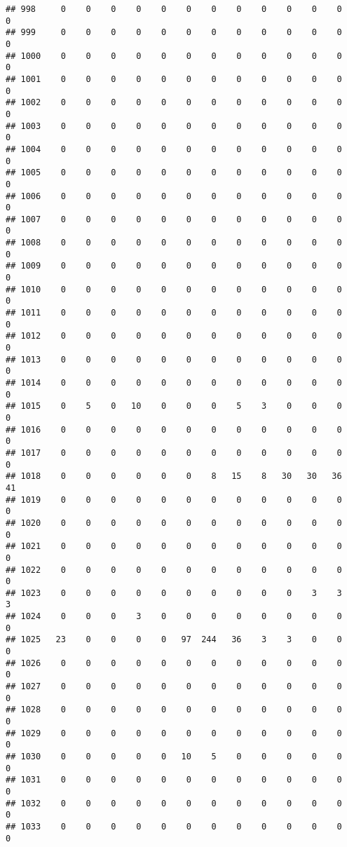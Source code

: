 \documentclass[]{article}
\begin{document}
\begin{verbatim}
## 998     0    0    0    0    0    0    0    0    0    0    0    0    0
## 999     0    0    0    0    0    0    0    0    0    0    0    0    0
## 1000    0    0    0    0    0    0    0    0    0    0    0    0    0
## 1001    0    0    0    0    0    0    0    0    0    0    0    0    0
## 1002    0    0    0    0    0    0    0    0    0    0    0    0    0
## 1003    0    0    0    0    0    0    0    0    0    0    0    0    0
## 1004    0    0    0    0    0    0    0    0    0    0    0    0    0
## 1005    0    0    0    0    0    0    0    0    0    0    0    0    0
## 1006    0    0    0    0    0    0    0    0    0    0    0    0    0
## 1007    0    0    0    0    0    0    0    0    0    0    0    0    0
## 1008    0    0    0    0    0    0    0    0    0    0    0    0    0
## 1009    0    0    0    0    0    0    0    0    0    0    0    0    0
## 1010    0    0    0    0    0    0    0    0    0    0    0    0    0
## 1011    0    0    0    0    0    0    0    0    0    0    0    0    0
## 1012    0    0    0    0    0    0    0    0    0    0    0    0    0
## 1013    0    0    0    0    0    0    0    0    0    0    0    0    0
## 1014    0    0    0    0    0    0    0    0    0    0    0    0    0
## 1015    0    5    0   10    0    0    0    5    3    0    0    0    0
## 1016    0    0    0    0    0    0    0    0    0    0    0    0    0
## 1017    0    0    0    0    0    0    0    0    0    0    0    0    0
## 1018    0    0    0    0    0    0    8   15    8   30   30   36   41
## 1019    0    0    0    0    0    0    0    0    0    0    0    0    0
## 1020    0    0    0    0    0    0    0    0    0    0    0    0    0
## 1021    0    0    0    0    0    0    0    0    0    0    0    0    0
## 1022    0    0    0    0    0    0    0    0    0    0    0    0    0
## 1023    0    0    0    0    0    0    0    0    0    0    3    3    3
## 1024    0    0    0    3    0    0    0    0    0    0    0    0    0
## 1025   23    0    0    0    0   97  244   36    3    3    0    0    0
## 1026    0    0    0    0    0    0    0    0    0    0    0    0    0
## 1027    0    0    0    0    0    0    0    0    0    0    0    0    0
## 1028    0    0    0    0    0    0    0    0    0    0    0    0    0
## 1029    0    0    0    0    0    0    0    0    0    0    0    0    0
## 1030    0    0    0    0    0   10    5    0    0    0    0    0    0
## 1031    0    0    0    0    0    0    0    0    0    0    0    0    0
## 1032    0    0    0    0    0    0    0    0    0    0    0    0    0
## 1033    0    0    0    0    0    0    0    0    0    0    0    0    0

\end{verbatim}
\end{document}
